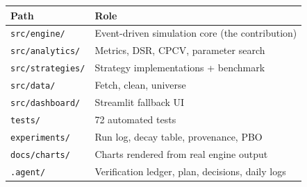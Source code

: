 \documentclass[12pt,a4paper,oneside]{report}
\begin{document}
\begin{center}
\begin{tabular}{@{}p{5.5cm}p{7.4cm}@{}}
\toprule
\textbf{Path} & \textbf{Role} \\
\midrule
\texttt{src/engine/} & Event-driven simulation core (the contribution) \\
\texttt{src/analytics/} & Metrics, DSR, CPCV, parameter search \\
\texttt{src/strategies/} & Strategy implementations + benchmark \\
\texttt{src/data/} & Fetch, clean, universe \\
\texttt{src/dashboard/} & Streamlit fallback UI \\
\texttt{tests/} & 72 automated tests \\
\texttt{experiments/} & Run log, decay table, provenance, PBO \\
\texttt{docs/charts/} & Charts rendered from real engine output \\
\texttt{.agent/} & Verification ledger, plan, decisions, daily logs \\
\bottomrule
\end{tabular}
\end{center}
\end{document}
